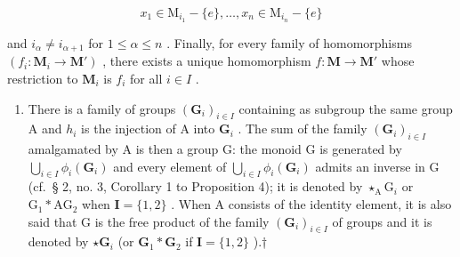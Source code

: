 \[
x _ {1} \in \mathrm{M} _ {i _ {1}} - \{e \}, \dots , x _ {n} \in \mathrm{M} _ {i _ {n}} - \{e \}
\]

and \(i_{\alpha} \neq i_{\alpha + 1}\) for \(1 \leqslant \alpha \leqslant n\) . Finally, for every family of homomorphisms \((f_i: \mathbf{M}_i \to \mathbf{M}')\) , there exists a unique homomorphism \(f: \mathbf{M} \to \mathbf{M}'\) whose restriction to \(\mathbf{M}_i\) is \(f_i\) for all \(i \in I\) .

\begin{enumerate}
\def\labelenumi{(\alph{enumi})}
\setcounter{enumi}{1}
\tightlist
\item
  There is a family of groups \((\mathbf{G}_i)_{i\in I}\) containing as subgroup the same group A and \(h_i\) is the injection of A into \(\mathbf{G}_i\) . The sum of the family \((\mathbf{G}_i)_{i\in I}\) amalgamated by A is then a group G: the monoid G is generated by \(\bigcup_{i\in I}\phi_i(\mathbf{G}_i)\) and every element of \(\bigcup_{i\in I}\phi_i(\mathbf{G}_i)\) admits an inverse in G (cf.~§ 2, no. 3, Corollary 1 to Proposition 4); it is denoted by \(\star_{\mathrm{A}}\mathrm{G}_{i}\) or \(\mathrm{G}_{1}*\mathrm{A}\mathrm{G}_{2}\) when \(\mathbf{I} = \{1,2\}\) . When A consists of the identity element, it is also said that G is the free product of the family \((\mathbf{G}_i)_{i\in I}\) of groups and it is denoted by \(\star \mathbf{G}_i\) (or \(\mathbf{G}_1*\mathbf{G}_2\) if \(\mathbf{I} = \{1,2\}\) ).†
\end{enumerate}

